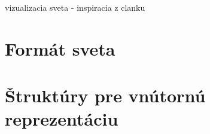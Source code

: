 vizualizacia sveta - inspiracia z clanku \cite{Untch1990}




\section{Formát sveta}


\section{Štruktúry pre vnútornú reprezentáciu}





